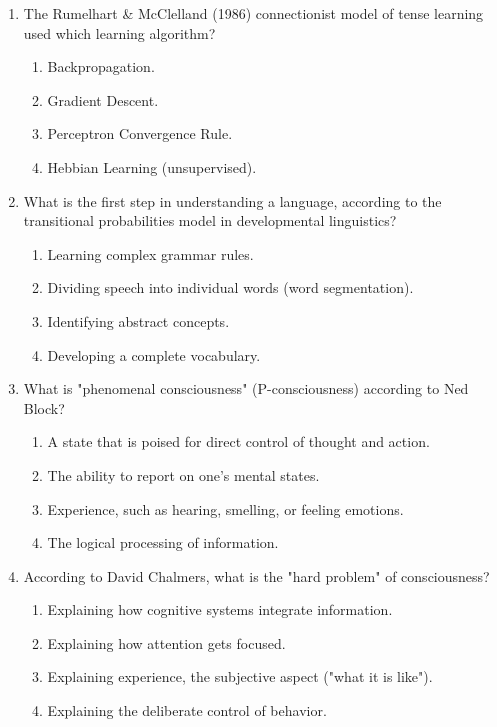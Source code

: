 \documentclass{article}
\begin{document}
\begin{enumerate}[label=\arabic*.]
\item The Rumelhart & McClelland (1986) connectionist model of tense learning used which learning algorithm?
\begin{enumerate}[label=(\alph*)]
    \item Backpropagation.
    \item Gradient Descent.
    \item Perceptron Convergence Rule.
    \item Hebbian Learning (unsupervised).
\end{enumerate}

\item What is the first step in understanding a language, according to the transitional probabilities model in developmental linguistics?
\begin{enumerate}[label=(\alph*)]
    \item Learning complex grammar rules.
    \item Dividing speech into individual words (word segmentation).
    \item Identifying abstract concepts.
    \item Developing a complete vocabulary.
\end{enumerate}

\item What is "phenomenal consciousness" (P-consciousness) according to Ned Block?
\begin{enumerate}[label=(\alph*)]
    \item A state that is poised for direct control of thought and action.
    \item The ability to report on one's mental states.
    \item Experience, such as hearing, smelling, or feeling emotions.
    \item The logical processing of information.
\end{enumerate}

\item According to David Chalmers, what is the "hard problem" of consciousness?
\begin{enumerate}[label=(\alph*)]
    \item Explaining how cognitive systems integrate information.
    \item Explaining how attention gets focused.
    \item Explaining experience, the subjective aspect ("what it is like").
    \item Explaining the deliberate control of behavior.
\end{enumerate}

\end{enumerate}
\end{document}
